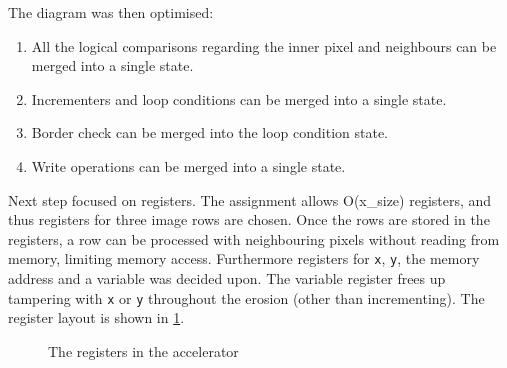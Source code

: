\documentclass[a4paper, english]{article}
\numberwithin{equation}{section}
\begin{document}
The diagram was then optimised:
\begin{enumerate}
    \item All the logical comparisons regarding the inner pixel and neighbours can be merged into a single state.
    \item Incrementers and loop conditions can be merged into a single state.
    \item Border check can be merged into the loop condition state.
    \item Write operations can be merged into a single state.
\end{enumerate}
Next step focused on registers. The assignment allows O(x\_size) registers, and thus registers for three image rows are chosen. Once the rows are stored in the registers, a row can be processed with neighbouring pixels without reading from memory, limiting memory access. Furthermore registers for \texttt{x}, \texttt{y}, the memory address and a variable was decided upon. The variable register frees up tampering with \texttt{x} or \texttt{y} throughout the erosion (other than incrementing). The register layout is shown in \cref{fig:regs}.
\begin{figure}
    \centering
    \caption{The registers in the accelerator}\label{fig:regs}
\end{figure}
\end{document}
